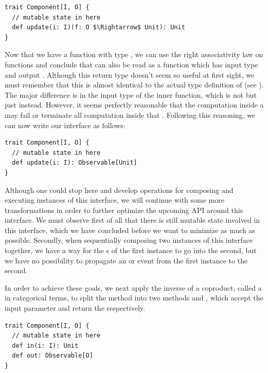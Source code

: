\begin{lstlisting}[style=InlineScalaStyle]
trait Component[I, O] {
  // mutable state in here
  def update(i: I)(f: O $\Rightarrow$ Unit): Unit
}
\end{lstlisting}

Now that we have a function  with type , we can use the right associativity law on functions and conclude that  can also be read as a function which has input type  and output . Although this return type doesn't seem so useful at first sight, we must remember that this is almost identical to the actual type definition of \obs (see ). The major difference is in the input type of the inner function, which is not  but just  instead. However, it seems perfectly reasonable that the computation inside a \comp may fail or terminate all computation inside that \comp. Following this reasoning, we can now write our interface as follows:

\begin{lstlisting}[style=InlineScalaStyle]
trait Component[I, O] {
  // mutable state in here
  def update(i: I): Observable[Unit]
}
\end{lstlisting}

Although one could stop here and develop operations for composing and executing instances of this interface, we will continue with some more transformations in order to further optimize the upcoming API around this interface. We must observe first of all that there is still mutable state involved in this interface, which we have concluded before we want to minimize as much as possible. Secondly, when sequentially composing two instances of this interface together, we have a way for the s of the first instance to go into the second, but we have no possibility to propagate an  or  event from the first instance to the second.

\begin{minipage}{\linewidth} %
In order to achieve these goals, we next apply the inverse of a coproduct, called a  in categorical terms, to split the  method into two methods  and , which accept the input parameter  and return the  respectively.

\begin{lstlisting}[style=InlineScalaStyle]
trait Component[I, O] {
  // mutable state in here
  def in(i: I): Unit
  def out: Observable[O]
}
\end{lstlisting}
\end{minipage}

